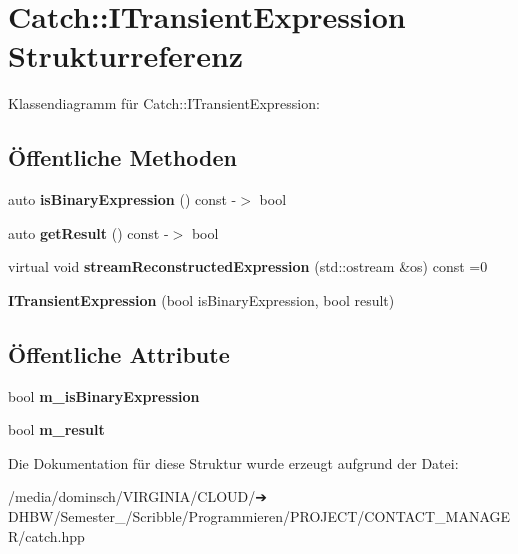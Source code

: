 \hypertarget{structCatch_1_1ITransientExpression}{}\section{Catch\+:\+:I\+Transient\+Expression Strukturreferenz}
\label{structCatch_1_1ITransientExpression}


Klassendiagramm für Catch\+:\+:I\+Transient\+Expression\+:
\subsection*{Öffentliche Methoden}
\begin{DoxyCompactItemize}
\item 
\mbox{\label{structCatch_1_1ITransientExpression_a3b436e13a0a6d3522bbf70d4e31deb22}} 
auto {\bfseries is\+Binary\+Expression} () const -\/$>$ bool
\item 
\mbox{\label{structCatch_1_1ITransientExpression_a101c7db86c87eff93a8ff496720e6320}} 
auto {\bfseries get\+Result} () const -\/$>$ bool
\item 
\mbox{\label{structCatch_1_1ITransientExpression_aabe1889df9c6e639a24afb08d8a0fe9e}} 
virtual void {\bfseries stream\+Reconstructed\+Expression} (std\+::ostream \&os) const =0
\item 
\mbox{\label{structCatch_1_1ITransientExpression_aafe69572b7ed884e63ec81f58d4afd8c}} 
{\bfseries I\+Transient\+Expression} (bool is\+Binary\+Expression, bool result)
\end{DoxyCompactItemize}
\subsection*{Öffentliche Attribute}
\begin{DoxyCompactItemize}
\item 
\mbox{\label{structCatch_1_1ITransientExpression_a75ce48da824d514d08152d396abb28d8}} 
bool {\bfseries m\+\_\+is\+Binary\+Expression}
\item 
\mbox{\label{structCatch_1_1ITransientExpression_a4646e2b5e0156e913653ec3b9b60c942}} 
bool {\bfseries m\+\_\+result}
\end{DoxyCompactItemize}


Die Dokumentation für diese Struktur wurde erzeugt aufgrund der Datei\+:\begin{DoxyCompactItemize}
\item 
/media/dominsch/\+V\+I\+R\+G\+I\+N\+I\+A/\+C\+L\+O\+U\+D/➔ D\+H\+B\+W/\+Semester\+\_/\+Scribble/\+Programmieren/\+P\+R\+O\+J\+E\+C\+T/\+C\+O\+N\+T\+A\+C\+T\+\_\+\+M\+A\+N\+A\+G\+E\+R/catch.\+hpp\end{DoxyCompactItemize}
